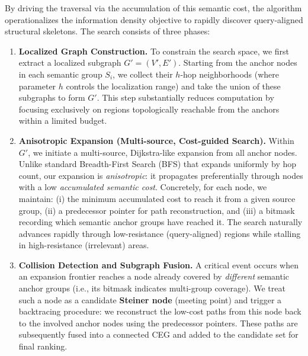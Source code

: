 By driving the traversal via the accumulation of this semantic cost, the algorithm operationalizes the information density objective to rapidly discover query-aligned structural skeletons. The search consists of three phases:

\begin{enumerate}[leftmargin=*, itemsep=0.3em, topsep=0.3em]
    \item \textbf{Localized Graph Construction.}
    To constrain the search space, we first extract a localized subgraph $G'=(V',E')$. Starting from the anchor nodes in each semantic group $S_i$, we collect their $h$-hop neighborhoods (where parameter $h$ controls the localization range) and take the union of these subgraphs to form $G'$. This step substantially reduces computation by focusing exclusively on regions topologically reachable from the anchors within a limited budget.

    \item \textbf{Anisotropic Expansion (Multi-source, Cost-guided Search).}
    Within $G'$, we initiate a multi-source, Dijkstra-like expansion from all anchor nodes. Unlike standard Breadth-First Search (BFS) that expands uniformly by hop count, our expansion is \emph{anisotropic}: it propagates preferentially through nodes with a low \emph{accumulated semantic cost}. Concretely, for each node, we maintain: (i) the minimum accumulated cost to reach it from a given source group, (ii) a predecessor pointer for path reconstruction, and (iii) a bitmask recording which semantic anchor groups have reached it. The search naturally advances rapidly through low-resistance (query-aligned) regions while stalling in high-resistance (irrelevant) areas.

    \item \textbf{Collision Detection and Subgraph Fusion.}
    A critical event occurs when an expansion frontier reaches a node already covered by \emph{different} semantic anchor groups (i.e., its bitmask indicates multi-group coverage). We treat such a node as a candidate \textbf{Steiner node} (meeting point) and trigger a backtracing procedure: we reconstruct the low-cost paths from this node back to the involved anchor nodes using the predecessor pointers. These paths are subsequently fused into a connected CEG and added to the candidate set for final ranking.
\end{enumerate}




